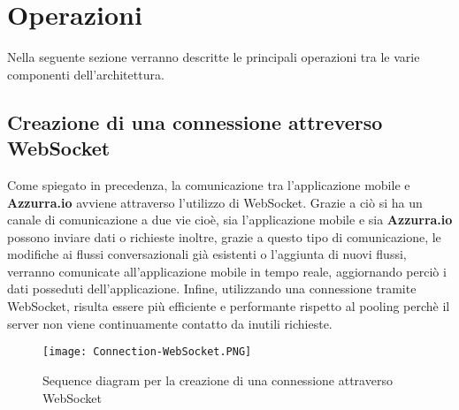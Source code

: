 \section{Operazioni}
Nella seguente sezione verranno descritte le principali operazioni tra le varie componenti dell'architettura.
\subsection{Creazione di una connessione attreverso WebSocket}
Come spiegato in precedenza, la comunicazione tra l'applicazione mobile e \textbf{Azzurra.io} avviene attraverso l'utilizzo di WebSocket. Grazie a ciò si ha un canale di comunicazione a due vie cioè, sia l'applicazione mobile e sia \textbf{Azzurra.io } possono inviare dati o richieste inoltre, grazie a questo tipo di comunicazione, le modifiche ai flussi conversazionali già esistenti o l'aggiunta di nuovi flussi, verranno comunicate all'applicazione mobile in tempo reale, aggiornando perciò i dati posseduti dell'applicazione. Infine, utilizzando una connessione tramite WebSocket, risulta essere più efficiente e performante rispetto al pooling perchè il server non viene continuamente contatto da inutili richieste.
\begin{figure}[h]
	\begin{center}
		\texttt{[image: Connection-WebSocket.PNG]}
		\caption{Sequence diagram per la creazione di una connessione attraverso WebSocket}\label{fig:websocket}
	\end{center}
\end{figure}

